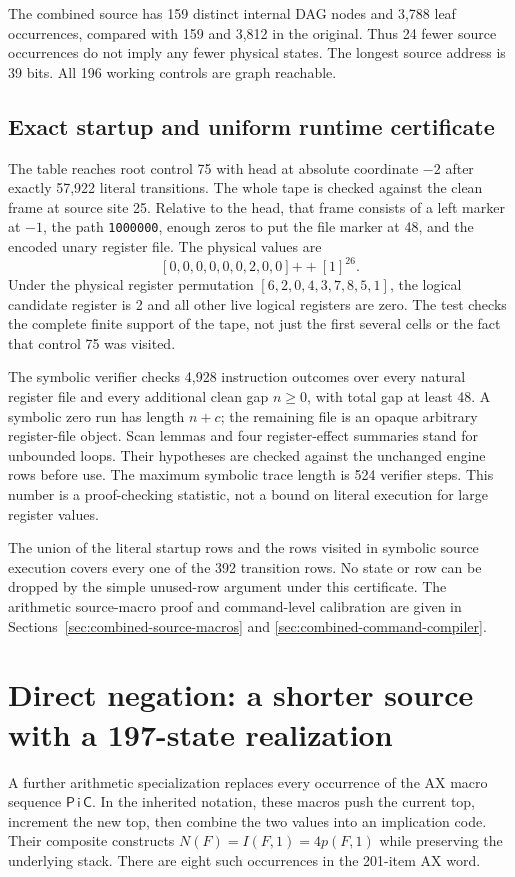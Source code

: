 \documentclass[11pt,a4paper]{article}
\begin{document}
The combined source has 159 distinct internal DAG nodes and 3,788 leaf
occurrences, compared with 159 and 3,812 in the original. Thus 24 fewer
source occurrences do not imply any fewer physical states. The longest
source address is 39 bits. All 196 working controls are graph reachable.

\subsection{Exact startup and uniform runtime certificate}
The table reaches root control 75 with head at absolute coordinate $-2$
after exactly 57,922 literal transitions. The whole tape is checked against
the clean frame at source site 25. Relative to the head, that frame consists
of a left marker at $-1$, the path \texttt{1000000}, enough zeros to put the
file marker at 48, and the encoded unary register file. The physical values
are
\[
 [0,0,0,0,0,0,2,0,0]\mathbin{+\!+}[1]^{26}.
\]
Under the physical register permutation
$[6,2,0,4,3,7,8,5,1]$, the logical candidate register is 2 and all other live
logical registers are zero. The test checks the complete finite support
of the tape, not just the first several cells or the fact that control 75
was visited.

The symbolic verifier checks 4,928 instruction outcomes over every natural
register file and every additional clean gap $n\ge0$, with total gap at
least 48. A symbolic zero run has length $n+c$; the remaining file is an
opaque arbitrary register-file object. Scan lemmas and four register-effect
summaries stand for unbounded loops. Their hypotheses are checked against
the unchanged engine rows before use. The maximum symbolic trace length
is 524 verifier steps. This number is a proof-checking statistic, not a
bound on literal execution for large register values.

The union of the literal startup rows and the rows visited in symbolic
source execution covers every one of the 392 transition rows. No state or
row can be dropped by the simple unused-row argument under this certificate.
The arithmetic source-macro proof and command-level calibration are given
in Sections~\ref{sec:combined-source-macros} and
\ref{sec:combined-command-compiler}.




\section{Direct negation: a shorter source with a 197-state realization}
\label{sec:direct-negation}
A further arithmetic specialization replaces every occurrence of the AX
macro sequence $\mathsf P\,\mathsf i\,\mathsf C$. In the inherited notation,
these macros push the current top, increment the new top, then combine the
two values into an implication code. Their composite constructs
$N(F)=I(F,1)=4p(F,1)$ while preserving the underlying stack. There are eight
such occurrences in the 201-item AX word.
\end{document}
